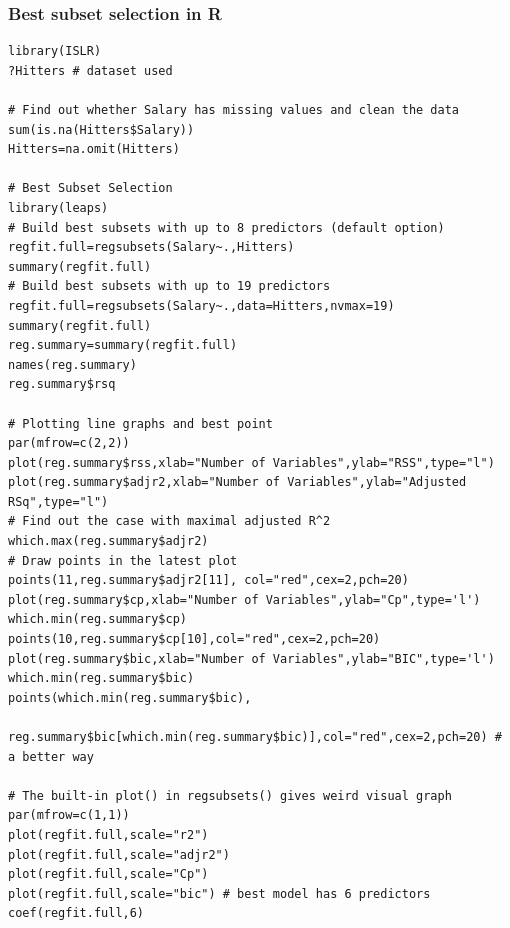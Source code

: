 \documentclass[11pt]{article}
\begin{document}
\subsubsection{Best subset selection in R}
\begin{lstlisting}
library(ISLR)
?Hitters # dataset used

# Find out whether Salary has missing values and clean the data
sum(is.na(Hitters$Salary))
Hitters=na.omit(Hitters)

# Best Subset Selection
library(leaps)
# Build best subsets with up to 8 predictors (default option)
regfit.full=regsubsets(Salary~.,Hitters)
summary(regfit.full)
# Build best subsets with up to 19 predictors
regfit.full=regsubsets(Salary~.,data=Hitters,nvmax=19)
summary(regfit.full)
reg.summary=summary(regfit.full)
names(reg.summary)
reg.summary$rsq

# Plotting line graphs and best point
par(mfrow=c(2,2))
plot(reg.summary$rss,xlab="Number of Variables",ylab="RSS",type="l")
plot(reg.summary$adjr2,xlab="Number of Variables",ylab="Adjusted RSq",type="l")
# Find out the case with maximal adjusted R^2
which.max(reg.summary$adjr2)
# Draw points in the latest plot
points(11,reg.summary$adjr2[11], col="red",cex=2,pch=20)
plot(reg.summary$cp,xlab="Number of Variables",ylab="Cp",type='l')
which.min(reg.summary$cp)
points(10,reg.summary$cp[10],col="red",cex=2,pch=20)
plot(reg.summary$bic,xlab="Number of Variables",ylab="BIC",type='l')
which.min(reg.summary$bic)
points(which.min(reg.summary$bic),
    reg.summary$bic[which.min(reg.summary$bic)],col="red",cex=2,pch=20) # a better way

# The built-in plot() in regsubsets() gives weird visual graph
par(mfrow=c(1,1))
plot(regfit.full,scale="r2")
plot(regfit.full,scale="adjr2")
plot(regfit.full,scale="Cp")
plot(regfit.full,scale="bic") # best model has 6 predictors
coef(regfit.full,6)
\end{lstlisting}
\end{document}
